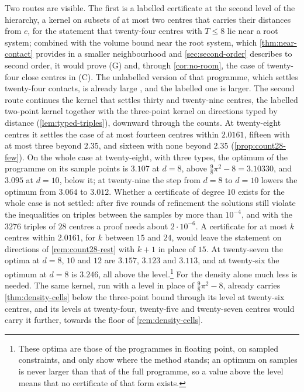 \documentclass[11pt,reqno]{amsart}
\renewcommand{\_}{\origunderscore\allowbreak}
\numberwithin{equation}{section}
\theoremstyle{plain}
\theoremstyle{definition}
\theoremstyle{remark}
\begin{document}
Two routes are visible. The first is a labelled certificate at the second
level of the hierarchy, a kernel on subsets of at most two centres that
carries their distances from $c$, for the statement that twenty-four centres
with $T\le8$ lie near a root system; combined with the volume bound near
the root system, which \cref{thm:near-contact} provides in a smaller
neighbourhood and \cref{sec:second-order} describes to second order, it
would prove (G) and, through \cref{cor:no-room}, the case of twenty-four
close centres in (C). The unlabelled version of that programme, which
settles twenty-four contacts, is already large \cite{LLM24}, and the
labelled one is larger. The second route continues the kernel that
settles thirty and twenty-nine centres, the labelled two-point kernel
together with the three-point kernel on directions typed by distance
(\cref{lem:typed-triples}), downward through the counts. At twenty-eight
centres it settles the case of at most fourteen centres within $2.0161$,
fifteen with at most three beyond $2.35$, and sixteen with none beyond $2.35$
(\cref{prop:count28-few}). On the whole case at twenty-eight, with three
types, the optimum of the programme on its sample points is $3.107$ at
$d=8$, above $\frac98\pi^2-8=3.10330$, and $3.095$ at $d=10$, below it; at
twenty-nine the step from $d=8$ to $d=10$ lowers the optimum from $3.064$ to
$3.012$. Whether a certificate of degree $10$ exists for the whole case is
not settled: after five rounds of refinement the solutions still violate the
inequalities on triples between the samples by more than $10^{-4}$, and with
the $3276$ triples of $28$ centres a proof needs about $2\cdot10^{-6}$. A
certificate for at most $k$ centres within $2.0161$, for $k$ between $15$
and $24$, would leave the statement on directions of
\cref{rem:count28-rest} with $k+1$ in place of $15$. At
twenty-seven the optima at $d=8$, $10$ and $12$ are $3.157$, $3.123$ and
$3.113$, and at twenty-six the optimum at $d=8$ is $3.246$, all above the
level.\footnote{These optima are those of the programmes
  in floating point, on sampled constraints, and only show where the method
  stands; an optimum on samples is never larger than that of the full
  programme, so a value above the level means that no certificate of that
  form exists.} For
the density alone much less is needed. The same kernel, run with a level in
place of $\frac98\pi^2-8$, already carries \cref{thm:density-cells} below the
three-point bound through its level at twenty-six centres, and its levels at
twenty-four, twenty-five and twenty-seven centres would carry it further,
towards the floor of \cref{rem:density-cells}.
\end{document}
